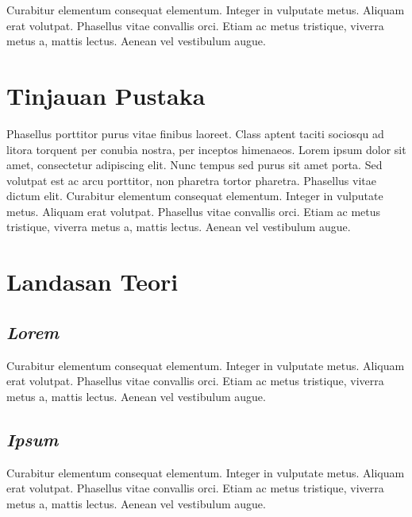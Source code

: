 

Curabitur elementum consequat elementum. Integer in vulputate
metus. Aliquam erat volutpat. Phasellus vitae convallis orci. Etiam ac
metus tristique, viverra metus a, mattis lectus. Aenean vel vestibulum
augue.

\section{Tinjauan Pustaka}

Phasellus porttitor purus \citet{warn} vitae finibus laoreet. Class
aptent taciti sociosqu ad litora torquent per conubia nostra, per
inceptos himenaeos. Lorem ipsum dolor sit amet, consectetur adipiscing
elit. Nunc tempus sed purus sit amet porta. Sed volutpat est ac arcu
porttitor, non pharetra tortor pharetra. Phasellus vitae dictum
elit. Curabitur elementum consequat elementum. Integer in vulputate
metus. Aliquam erat volutpat. Phasellus vitae convallis orci. Etiam ac
metus tristique, viverra metus a, mattis lectus. Aenean vel vestibulum
augue.

\section{Landasan Teori}


\subsection{\emph{Lorem}}
\label{subsec:label}

Curabitur elementum consequat elementum. Integer in vulputate
metus. Aliquam erat volutpat. Phasellus vitae convallis orci. Etiam ac
metus tristique, viverra metus a, mattis lectus. Aenean vel vestibulum
augue.

\subsection{\emph{Ipsum}}
\label{subsec:label}

Curabitur elementum consequat elementum. Integer in vulputate
metus. Aliquam erat volutpat. Phasellus vitae convallis orci. Etiam ac
metus tristique, viverra metus a, mattis lectus. Aenean vel vestibulum
augue.

